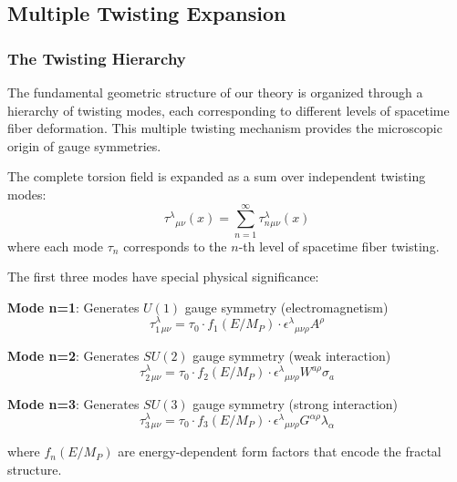\subsection{Multiple Twisting Expansion}
\label{sec:multiple_twisting}

\subsubsection{The Twisting Hierarchy}

The fundamental geometric structure of our theory is organized through a hierarchy of twisting modes, each corresponding to different levels of spacetime fiber deformation. This multiple twisting mechanism provides the microscopic origin of gauge symmetries.

\begin{definition}
The complete torsion field is expanded as a sum over independent twisting modes:
\begin{equation}
    \tau^{\lambda}{}_{\mu\nu}(x) = \sum_{n=1}^{\infty} \tau_n^{\lambda}{}_{\mu\nu}(x)
\end{equation}
where each mode $\tau_n$ corresponds to the $n$-th level of spacetime fiber twisting.
\end{definition}

The first three modes have special physical significance:

\textbf{Mode n=1}: Generates $U(1)$ gauge symmetry (electromagnetism)
\begin{equation}
    \tau_1^{\lambda}{}_{\mu\nu} = \tau_0 \cdot f_1(E/M_P) \cdot \epsilon^{\lambda}{}_{\mu\nu\rho} A^{\rho}
\end{equation}

\textbf{Mode n=2}: Generates $SU(2)$ gauge symmetry (weak interaction)
\begin{equation}
    \tau_2^{\lambda}{}_{\mu\nu} = \tau_0 \cdot f_2(E/M_P) \cdot \epsilon^{\lambda}{}_{\mu\nu\rho} W^{a\rho} \sigma_a
\end{equation}

\textbf{Mode n=3}: Generates $SU(3)$ gauge symmetry (strong interaction)
\begin{equation}
    \tau_3^{\lambda}{}_{\mu\nu} = \tau_0 \cdot f_3(E/M_P) \cdot \epsilon^{\lambda}{}_{\mu\nu\rho} G^{\alpha\rho} \lambda_{\alpha}
\end{equation}

where $f_n(E/M_P)$ are energy-dependent form factors that encode the fractal structure.

